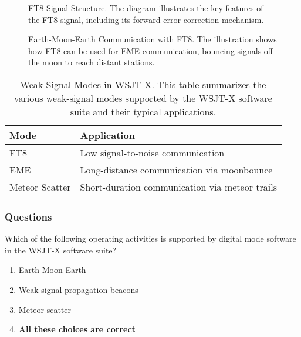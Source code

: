 \begin{figure}[h!]
    \centering
    \caption{FT8 Signal Structure. The diagram illustrates the key features of the FT8 signal, including its forward error correction mechanism.}
    \label{fig:ft8-structure}
\end{figure}

\begin{figure}[h!]
    \centering
    \caption{Earth-Moon-Earth Communication with FT8. The illustration shows how FT8 can be used for EME communication, bouncing signals off the moon to reach distant stations.}
    \label{fig:eme-ft8}
\end{figure}

\begin{table}[h!]
    \centering
    \begin{tabular}{|l|l|}
        \hline
        \textbf{Mode} & \textbf{Application} \\
        \hline
        FT8 & Low signal-to-noise communication \\
        EME & Long-distance communication via moonbounce \\
        Meteor Scatter & Short-duration communication via meteor trails \\
        \hline
    \end{tabular}
    \caption{Weak-Signal Modes in WSJT-X. This table summarizes the various weak-signal modes supported by the WSJT-X software suite and their typical applications.}
    \label{tab:wsjt-x-modes}
\end{table}

\subsubsection*{Questions}

\begin{tcolorbox}[colback=gray!10!white,colframe=black!75!black,title={T8D10}]
    Which of the following operating activities is supported by digital mode software in the WSJT-X software suite?
    \begin{enumerate}[label=\Alph*),noitemsep]
        \item Earth-Moon-Earth
        \item Weak signal propagation beacons
        \item Meteor scatter
        \item \textbf{All these choices are correct}
    \end{enumerate}
\end{tcolorbox}

